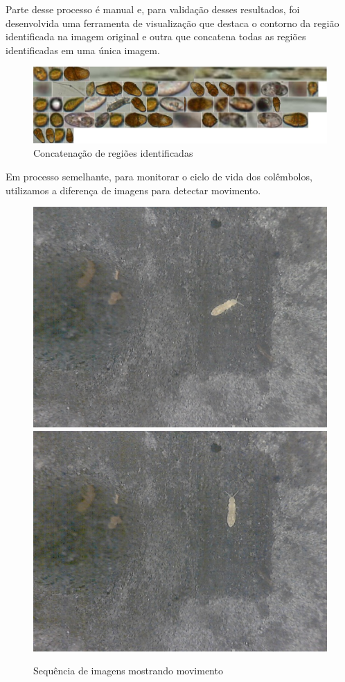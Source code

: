 \documentclass[]{article}
\begin{document}
Parte desse processo é manual e, para validação desses resultados, foi desenvolvida uma ferramenta de visualização que destaca o contorno da região identificada na imagem original e outra que concatena todas as regiões identificadas em uma única imagem.

\begin{figure}[!ht]
\centering
\includegraphics[scale=.35]{./bio_concat}
\caption{Concatenação de regiões identificadas}
\label{fig:bio_concat}
\end{figure}

Em processo semelhante, para monitorar o ciclo de vida dos colêmbolos, utilizamos a diferença de imagens para detectar movimento.

\begin{figure}[!ht]
\centering
\includegraphics[scale=.25]{./imagedani2-12}
\includegraphics[scale=.25]{./imagedani2-13}
\caption{Sequência de imagens mostrando movimento}
\label{fig:movimento}
\end{figure}
\end{document}
